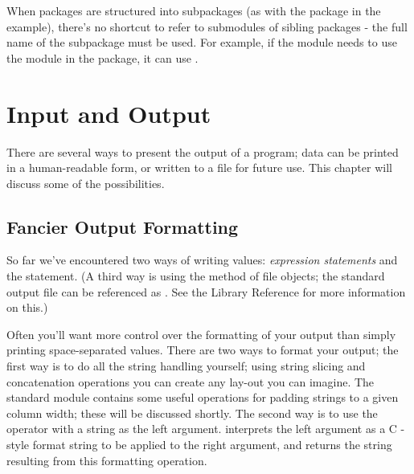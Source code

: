 \documentclass{manual}
\begin{document}
When packages are structured into subpackages (as with the 
package in the example), there's no shortcut to refer to submodules of
sibling packages - the full name of the subpackage must be used.  For
example, if the module  needs to use the 
module in the  package, it can use .




\chapter{Input and Output \label{io}}

There are several ways to present the output of a program; data can be
printed in a human-readable form, or written to a file for future use.
This chapter will discuss some of the possibilities.


\section{Fancier Output Formatting \label{formatting}}

So far we've encountered two ways of writing values: \emph{expression
statements} and the  statement.  (A third way is using
the  method of file objects; the standard output file
can be referenced as .  See the Library Reference for
more information on this.)

Often you'll want more control over the formatting of your output than
simply printing space-separated values.  There are two ways to format
your output; the first way is to do all the string handling yourself;
using string slicing and concatenation operations you can create any
lay-out you can imagine.  The standard module
 contains some useful operations
for padding strings to a given column width;
these will be discussed shortly.  The second way is to use the
\code{\%} operator with a string as the left argument.  \code{\%}
interprets the left argument as a C -style
format string to be applied to the right argument, and returns the
string resulting from this formatting operation.
\end{document}
